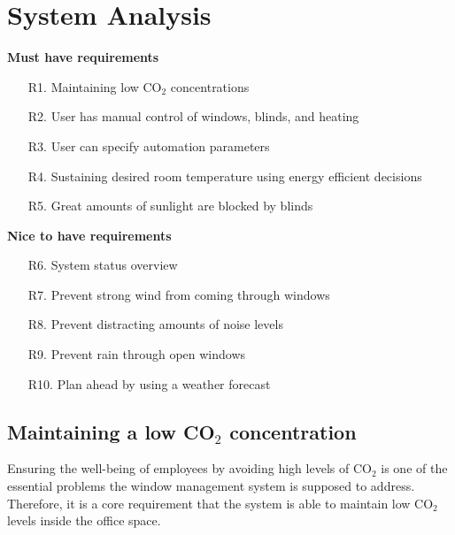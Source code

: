 \documentclass[runningheads]{llncs}
\begin{document}
\section{System Analysis}

\begin{description}
\item{\textbf{Must have requirements}}\
\begin{itemize}
    \item [R1.] Maintaining low CO$_2$ concentrations
    \item [R2.] User has manual control of windows, blinds, and heating
    \item [R3.] User can specify automation parameters
    \item [R4.] Sustaining desired room temperature using energy efficient decisions
    \item [R5.] Great amounts of sunlight are blocked by blinds
\end{itemize}
\item{\textbf{Nice to have requirements}}\
\begin{itemize}
    \item [R6.] System status overview 
    \item [R7.] Prevent strong wind from coming through windows 
    \item [R8.] Prevent distracting amounts of noise levels
    \item [R9.] Prevent rain through open windows
    \item [R10.] Plan ahead by using a weather forecast 
\end{itemize}
\end{description}

\subsection{Maintaining a low CO$_2$ concentration}

Ensuring the well-being of employees by avoiding high levels of CO$_2$ is one of the essential problems the window management system is supposed to address. Therefore, it is a core requirement that the system is able to maintain low CO$_2$ levels inside the office space.
\end{document}
